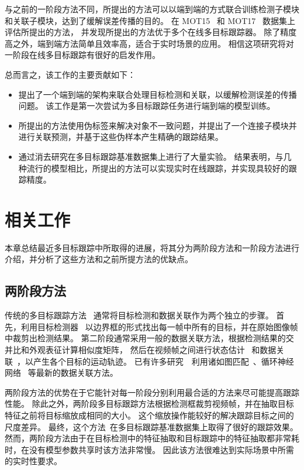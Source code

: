 与之前的一阶段方法不同，所提出的方法可以以端到端的方式联合训练检测子模块和关联子模块，达到了缓解误差传播的目的。
在 MOT15~\cite{mot15} 和 MOT17~\cite{mot16} 数据集上评估所提出的方法，
并发现所提出的方法优于多个在线多目标跟踪器。
除了精度高之外，端到端方法简单且效率高，适合于实时场景的应用。
相信这项研究将对一阶段在线多目标跟踪有很好的启发作用。


总而言之，该工作的主要贡献如下：
\begin{itemize}
	\item 提出了一个端到端的架构来联合处理目标检测和关联，以缓解检测误差的传播问题。 
	该工作是第一次尝试为多目标跟踪任务进行端到端的模型训练。
	\item 所提出的方法使用伪标签来解决对象不一致问题，并提出了一个连接子模块并进行关联预测，并基于这些伪样本产生精确的跟踪结果。
	\item 通过消去研究在多目标跟踪基准数据集上进行了大量实验。
	结果表明，与几种流行的模型相比，所提出的方法可以实现实时在线跟踪，并实现具较好的跟踪精度。
\end{itemize}


\section{相关工作}
本章总结最近多目标跟踪中所取得的进展，将其分为两阶段方法和一阶段方法进行介绍，并分析了这些方法和之前所提方法的优缺点。
 
\subsection{两阶段方法}
传统的多目标跟踪方法~\cite{deep_sort,mahmoudi2019multi,zhou2018online} 通常将目标检测和数据关联作为两个独立的步骤。
首先，利用目标检测器~\cite{he2017mask,redmon2018yolov3} 以边界框的形式找出每一帧中所有的目标，并在原始图像帧中裁剪出检测结果。
第二阶段通常采用一般的数据关联方法，根据检测结果的交并比和外观表征计算相似度矩阵，
然后在视频帧之间进行状态估计~\cite{multi_pattern,local_sparse,dynamic_fusion} 和数据关联~\cite{kuhn1955hungarian,zhou2018online}，以产生各个目标的运动轨迹。
已有许多研究~\cite{mahmoudi2019multi}~利用诸如图匹配~\cite{zhou2018online}、循环神经网络~\cite{fang2018recurrent} 等最新的数据关联方法。

两阶段方法的优势在于它能针对每一阶段分别利用最合适的方法来尽可能提高跟踪性能。
除此之外，两阶段多目标跟踪方法根据检测框裁剪视频帧，并在抽取目标特征之前将目标缩放成相同的大小。
这个缩放操作能较好的解决跟踪目标之间的尺度差异。
最终，这个方法~\cite{poi}在多目标跟踪基准数据集上取得了很好的跟踪效果。
然而，两阶段方法由于在目标检测中的特征抽取和目标跟踪中的特征抽取都非常耗时，在没有模型参数共享时该方法非常慢。
因此该方法很难达到实际场景中所需的实时性要求。

